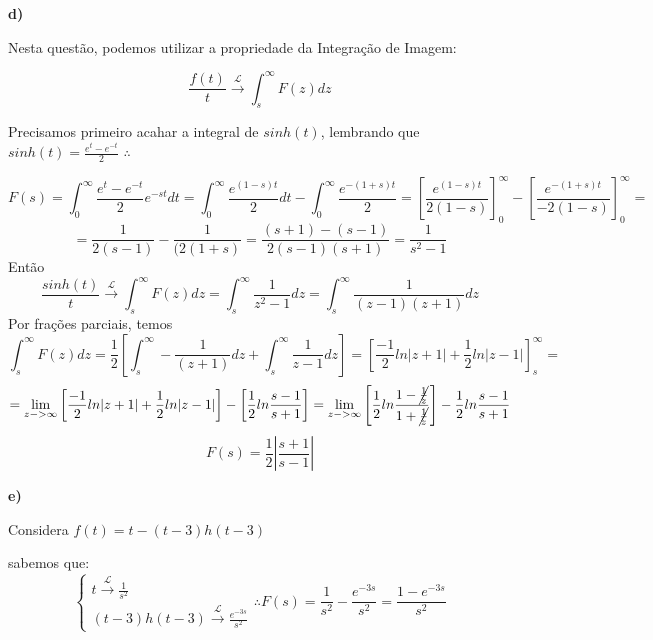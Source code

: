 \textbf{d)} 

Nesta questão, podemos utilizar a propriedade da Integração de Imagem:

\begin{equation*}
    \frac{f(t)}{t} \xrightarrow{\mathcal{L}} \int_s^\infty F(z)dz
\end{equation*}

Precisamos primeiro acahar a integral de $sinh(t)$, lembrando que $sinh(t) = \frac{e^t - e^{-t}}{2}$ $\therefore$

\begin{equation*}
    F(s) = \int_0^\infty \frac{e^t - e^{-t}}{2} e^{-st} dt = \int_0^\infty \frac{e^{(1-s)t}}{2}dt - \int_0^\infty \frac{e^{-(1+s)t}}{2} = 
    \left[\frac{e^{(1-s)t}}{2(1-s)}\right]^\infty_0 - \left[\frac{e^{-(1+s)t}}{-2(1-s)}\right]^\infty_0 = 
\end{equation*}
\begin{equation*}
    = \frac{1}{2(s-1)} - \frac{1}{(2(1+s)} = \frac{(s+1) - (s-1)}{2(s-1)(s+1)} = \frac{1}{s^2 - 1}
\end{equation*}
Então
\begin{equation*}
    \frac{sinh(t)}{t} \xrightarrow{\mathcal{L}} \int_s^\infty F(z)dz = \int_s^\infty \frac{1}{z^2-1}dz = \int_s^\infty \frac{1}{(z-1)(z+1)}dz
\end{equation*}
Por frações parciais, temos
\begin{equation*}
    \int_s^\infty F(z)dz = \frac{1}{2} \left[\int_s^\infty -\frac{1}{(z+1)}dz +  \int_s^\infty \frac{1}{z-1}dz\right] = \left[\frac{-1}{2}ln|z+1| + \frac{1}{2}ln|z-1|\right]^\infty_s = 
\end{equation*}
\begin{equation*}
    = \lim_{z->\infty} \left[\frac{-1}{2}ln|z+1| + \frac{1}{2}ln|z-1|\right] - \left[\frac{1}{2}ln\frac{s-1}{s+1}\right] = \lim_{z->\infty} \left[\frac{1}{2}ln\frac{1-\cancel{\frac{1}{z}}}{1+\cancel{\frac{1}{z}}}\right] - \frac{1}{2}ln\frac{s-1}{s+1}
\end{equation*}
\begin{equation*}
    \boxed{F(s) = \frac{1}{2}\left|\frac{s+1}{s-1}\right|}
\end{equation*}

\textbf{e)}

Considera $f(t) = t - (t-3)h(t-3)$

sabemos que:
\begin{equation*}
    \begin{cases}
    t\xrightarrow{\mathcal{L}}\frac{1}{s^2}\\
    (t-3)h(t-3) \xrightarrow{\mathcal{L}} \frac{e^{-3s}}{s^2}
    \end{cases}\therefore \boxed{F(s) = \frac{1}{s^2} - \frac{e^{-3s}}{s^2} = \frac{1-e^{-3s}}{s^2}}
\end{equation*}

